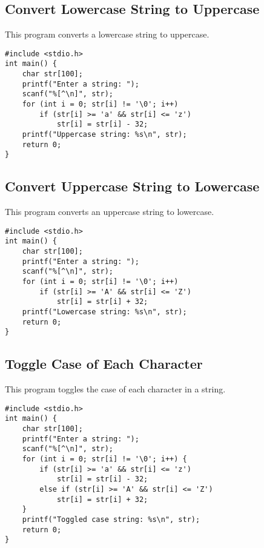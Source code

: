 \documentclass[a4paper,12pt]{article}
\begin{document}
\subsection{Convert Lowercase String to Uppercase}
This program converts a lowercase string to uppercase.
\begin{lstlisting}[caption={Convert Lowercase String to Uppercase}]
#include <stdio.h>
int main() {
    char str[100];
    printf("Enter a string: ");
    scanf("%[^\n]", str);
    for (int i = 0; str[i] != '\0'; i++)
        if (str[i] >= 'a' && str[i] <= 'z')
            str[i] = str[i] - 32;
    printf("Uppercase string: %s\n", str);
    return 0;
}
\end{lstlisting}
\clearpage

\subsection{Convert Uppercase String to Lowercase}
This program converts an uppercase string to lowercase.
\begin{lstlisting}[caption={Convert Uppercase String to Lowercase}]
#include <stdio.h>
int main() {
    char str[100];
    printf("Enter a string: ");
    scanf("%[^\n]", str);
    for (int i = 0; str[i] != '\0'; i++)
        if (str[i] >= 'A' && str[i] <= 'Z')
            str[i] = str[i] + 32;
    printf("Lowercase string: %s\n", str);
    return 0;
}
\end{lstlisting}
\clearpage

\subsection{Toggle Case of Each Character}
This program toggles the case of each character in a string.
\begin{lstlisting}[caption={Toggle Case of Each Character}]
#include <stdio.h>
int main() {
    char str[100];
    printf("Enter a string: ");
    scanf("%[^\n]", str);
    for (int i = 0; str[i] != '\0'; i++) {
        if (str[i] >= 'a' && str[i] <= 'z')
            str[i] = str[i] - 32;
        else if (str[i] >= 'A' && str[i] <= 'Z')
            str[i] = str[i] + 32;
    }
    printf("Toggled case string: %s\n", str);
    return 0;
}
\end{lstlisting}
\clearpage
\end{document}
